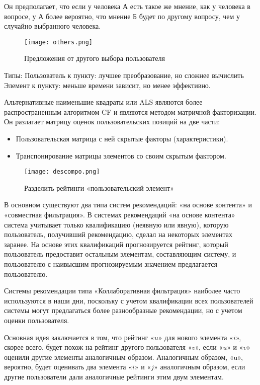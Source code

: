 Он предполагает, что если у человека А есть такое же мнение, как у человека в вопросе, у А более вероятно, что мнение Б будет по другому вопросу, чем у случайно выбранного человека.

\begin{figure}[h]
  \centering
  \texttt{[image: others.png]}
  \caption{Предложения от другого выбора пользователя}
  \label{image:scheme10}
\end{figure}

Типы: Пользователь к пункту: лучшее преобразование, но сложнее вычислить
Элемент к пункту: меньше времени зависит, но менее эффективно.

Альтернативные наименьшие квадраты или ALS являются более распространенным алгоритмом CF и являются методом матричной факторизации.
Он разлагает матрицу оценок пользовательских позиций на две части:


\begin{itemize}
    \item Пользовательская матрица с ней скрытые факторы (характеристики).
    \item Транспонирование матрицы элементов со своим скрытым фактором.
\end{itemize}

\begin{figure}[h]
  \centering
  \texttt{[image: descompo.png]}
  \caption{Разделить рейтинги «пользовательский элемент»}
  \label{image:scheme11}
\end{figure}

В основном существуют два типа систем рекомендаций: «на основе контента» и «совместная фильтрация». В системах рекомендаций «на основе контента» система учитывает только квалификацию (неявную или явную), которую пользователь, получивший рекомендацию, сделал на некоторых элементах заранее. На основе этих квалификаций прогнозируется рейтинг, который пользователь предоставит остальным элементам, составляющим систему, и пользователю с наивысшим прогнозируемым значением предлагается пользователю.

Системы рекомендации типа «Коллаборативная фильтрация» наиболее часто используются в наши дни, поскольку с учетом квалификации всех пользователей системы могут предлагаться более разнообразные рекомендации, но с учетом оценки пользователя.

Основная идея заключается в том, что рейтинг «$u$» для нового элемента «$i$», скорее всего, будет похож на рейтинг другого пользователя «$v$», если «$u$» и «$v$» оценили другие элементы аналогичным образом. Аналогичным образом, «u», вероятно, будет оценивать два элемента «$i$» и «$j$» аналогичным образом, если другие пользователи дали аналогичные рейтинги этим двум элементам.

